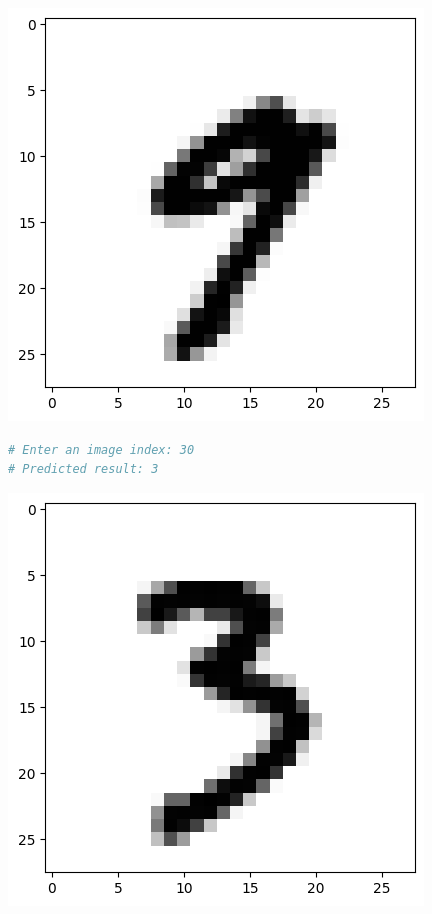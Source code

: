 \documentclass{book}
\begin{document}
\begin{center}
    \includegraphics[scale=0.4]{chapter 9/ch9_figure12.png}
\end{center}
\begin{lstlisting}[language=Python, basicstyle=\ttfamily\small, keywordstyle=\color{blue}, commentstyle=\color{forestgreen}, stringstyle=\color{red}, showstringspaces=false]
# Enter an image index: 30
# Predicted result: 3
\end{lstlisting}
\begin{center}
    \includegraphics[scale=0.4]{chapter 9/ch9_figure13.png}
\end{center}
\newpage
\end{document}
